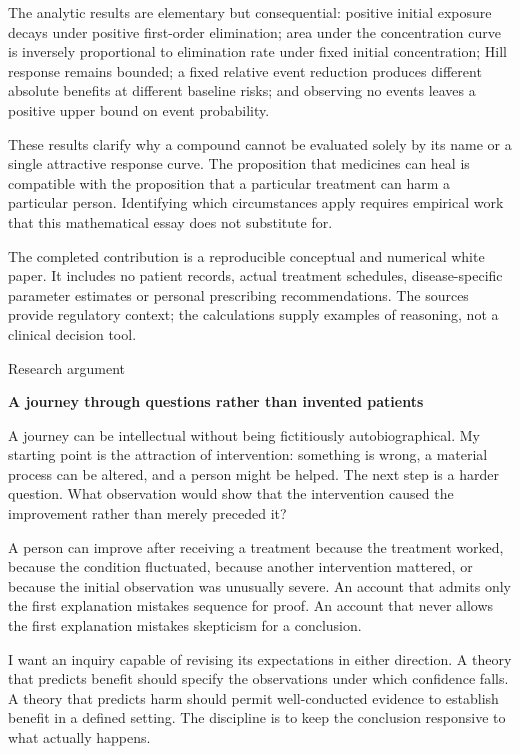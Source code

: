 \documentclass[10pt]{article}
\begin{document}
The analytic results are elementary but consequential: positive initial exposure decays under positive first-order elimination; area under the concentration curve is inversely proportional to elimination rate under fixed initial concentration; Hill response remains bounded; a fixed relative event reduction produces different absolute benefits at different baseline risks; and observing no events leaves a positive upper bound on event probability.\par
These results clarify why a compound cannot be evaluated solely by its name or a single attractive response curve. The proposition that medicines can heal is compatible with the proposition that a particular treatment can harm a particular person. Identifying which circumstances apply requires empirical work that this mathematical essay does not substitute for.\par
The completed contribution is a reproducible conceptual and numerical white paper. It includes no patient records, actual treatment schedules, disease-specific parameter estimates or personal prescribing recommendations. The sources provide regulatory context; the calculations supply examples of reasoning, not a clinical decision tool.\par
\clearpage
{\small\color{accent}Research argument}\par
{\LARGE\bfseries\color{ink}A journey through questions rather than invented patients}\par\vspace{7pt}
A journey can be intellectual without being fictitiously autobiographical. My starting point is the attraction of intervention: something is wrong, a material process can be altered, and a person might be helped. The next step is a harder question. What observation would show that the intervention caused the improvement rather than merely preceded it?\par
A person can improve after receiving a treatment because the treatment worked, because the condition fluctuated, because another intervention mattered, or because the initial observation was unusually severe. An account that admits only the first explanation mistakes sequence for proof. An account that never allows the first explanation mistakes skepticism for a conclusion.\par
I want an inquiry capable of revising its expectations in either direction. A theory that predicts benefit should specify the observations under which confidence falls. A theory that predicts harm should permit well-conducted evidence to establish benefit in a defined setting. The discipline is to keep the conclusion responsive to what actually happens.\par
\end{document}
